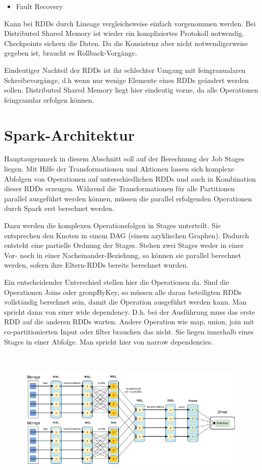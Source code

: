 \begin{itemize}
\item Fault Recovery
\end{itemize}
Kann bei RDDs durch Lineage vergleichsweise einfach vorgenommen werden.
Bei Distributed Shared Memory ist wieder ein kompliziertes Protokoll
notwendig. Checkpoints sichern die Daten. Da die Konsistenz aber nicht
notwendigerweise gegeben ist, braucht es Rollback-Vorgänge. 

Eindeutiger Nachteil der RDDs ist ihr schlechter Umgang mit
feingranualaren Schreibevorgänge, d.h wenn nur wenige Elemente eines
RDDs geändert werden sollen. Distributed Shared Memory liegt hier
eindeutig vorne, da alle Operationen feingranular erfolgen können.

\section[Spark{}-Architektur]{\rmfamily
Spark-Architektur}
Hauptaugenmerk in diesem Abschnitt soll auf der Berechnung der Job
Stages liegen. Mit Hilfe der Transformationen und Aktionen lassen sich
komplexe Abfolgen von Operationen auf unterschiedlichen RDDs und auch
in Kombination dieser RDDs erzeugen. Während die Transformationen für
alle Partitionen parallel ausgeführt werden können, müssen die parallel
erfolgenden Operationen durch Spark erst berechnet werden.

Dazu werden die komplexen Operationsfolgen in Stages unterteilt. Sie
entsprechen den Knoten in einem DAG (einem azyklischen Graphen).
Dadurch entsteht eine partielle Ordnung der Stages. Stehen zwei Stages
weder in einer Vor- noch in einer Nacheinander-Beziehung, so können sie
parallel berechnet werden, sofern ihre Eltern-RDDs bereits berechnet
wurden. 

Ein entscheidender Unterschied stellen hier die Operationen da. Sind die
Operationen Joins oder groupByKey, so müssen alle daran beteiligten
RDDs vollständig berechnet sein, damit die Operation ausgeführt werden
kann. Man spricht dann von einer wide dependency. D.h. bei der
Ausführung muss das erste RDD auf die anderen RDDs warten. Andere
Operation wie map, union, join mit co-partitionierten Input oder filter
brauchen das nicht. Sie liegen innerhalb eines Stages in einer Abfolge.
Man spricht hier von narrow dependencies.

\begin{figure}
\centering
\includegraphics[width=15.24cm,height=6.765cm]{bilder/Seminartext-img2.png}
\end{figure}

